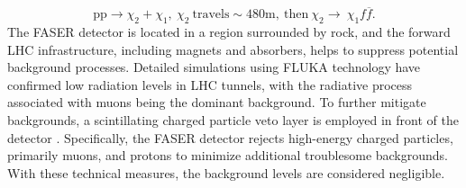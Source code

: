 \documentclass[preprint, superscriptaddress,amsmath, nofootinbib]{revtex4-1}
\begin{document}
\begin{equation}
    \text{pp} \rightarrow \chi_{2} + \chi_{1},\ \chi_{2} \ \text{travels} \sim480\text{m},\ \text{then} \ \chi_{2} \rightarrow \ \chi_{1} f\overline{f}.
\end{equation}
The FASER detector is located in a region surrounded by rock, and the forward LHC infrastructure, including magnets and absorbers, helps to suppress potential background processes. Detailed simulations using FLUKA technology \cite{Ferrari:2005zk,BOHLEN2014211} have confirmed low radiation levels in LHC tunnels, with the radiative process associated with muons being the dominant background. To further mitigate backgrounds, a scintillating charged particle veto layer is employed in front of the detector \cite{Berlin:2018jbm}. Specifically, the FASER detector rejects high-energy charged particles, primarily muons, and protons to minimize additional troublesome backgrounds. With these technical measures, the background levels are considered negligible.
\end{document}
